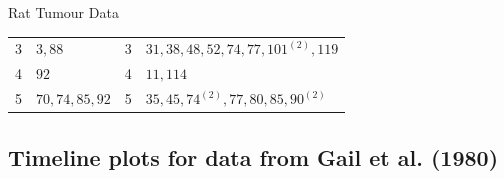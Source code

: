 \documentclass{article}\usepackage[]{graphicx}\usepackage[svgnames]{xcolor}
\begin{document}
\begin{Example}{Rat Tumour Data}
\begin{center}
\begin{NiceTabular}{clcl}
            3                            & $3,88$                   & 3                          & $31, 38, 48, 52, 74, 77, 101^{(2)} , 119$         \\
            4                            & $92$                     & 4                          & $ 11, 114  $                                \\
            5                            & $70,74,85,92$            & 5                          & $35,45,74^{(2)},77,80,85,90^{(2)}$              \\
            \bottomrule
        \end{NiceTabular}
    \end{center}
\end{Example}
\subsection*{Timeline plots for data from Gail et al. (1980)}
\end{document}
